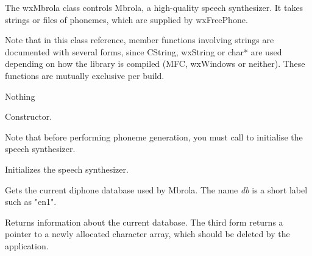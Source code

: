 The wxMbrola class controls Mbrola, a high-quality speech synthesizer.
It takes strings or files of phonemes, which are supplied by wxFreePhone.

Note that in this class reference, member functions involving strings are documented
with several forms, since CString, wxString or char* are used depending on how the
library is compiled (MFC, wxWindows or neither). These functions are mutually exclusive
per build.


Nothing






Constructor.

Note that before performing phoneme generation, you must call  to
initialise the speech synthesizer.

\label{wxmbrolainit}


Initializes the speech synthesizer.

\label{wxmbrolagetcurrentdatabase}




Gets the current diphone database used by Mbrola. The name {\it db} is a short label such as "en1".

\label{wxmbrolagetdatabaseallinfo}




Returns information about the current database. The third form returns a pointer to a newly allocated
character array, which should be deleted by the application.


